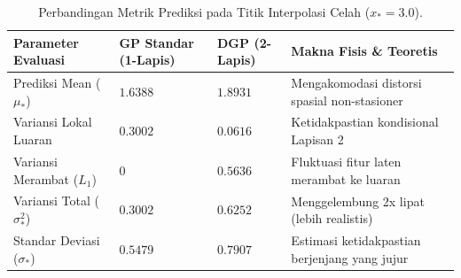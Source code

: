 \documentclass[11pt,a4paper]{article}
\begin{document}
\begin{table}[H]
\centering
\small
\renewcommand{\arraystretch}{0.95}
\caption{Perbandingan Metrik Prediksi pada Titik Interpolasi Celah ($x_* = 3.0$).}
\label{tab:komparasi}
\begin{tabularx}{\textwidth}{l>{\centering\arraybackslash}X>{\centering\arraybackslash}X>{\raggedright\arraybackslash}X}
\toprule
\textbf{Parameter Evaluasi} & \textbf{GP Standar (1-Lapis)} & \textbf{DGP (2-Lapis)} & \textbf{Makna Fisis \& Teoretis} \\
\midrule
Prediksi Mean ($\mu_*$) & $1.6388$ & $\mathbf{1.8931}$ & Mengakomodasi distorsi spasial non-stasioner \\
Variansi Lokal Luaran & $0.3002$ & $0.0616$ & Ketidakpastian kondisional Lapisan 2 \\
Variansi Merambat ($L_1$) & $0$ & $\mathbf{0.5636}$ & Fluktuasi fitur laten merambat ke luaran \\
Variansi Total ($\sigma_*^2$) & $0.3002$ & $\mathbf{0.6252}$ & Menggelembung 2x lipat (lebih realistis) \\
Standar Deviasi ($\sigma_*$) & $0.5479$ & $\mathbf{0.7907}$ & Estimasi ketidakpastian berjenjang yang jujur \\
\bottomrule
\end{tabularx}
\end{table}
\end{document}
